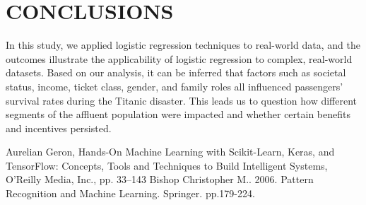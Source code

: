 \documentclass[conference]{IEEEtran}
\begin{document}
\vspace{2mm} %

\section{CONCLUSIONS}
In this study, we applied logistic regression techniques to real-world data, and the outcomes illustrate the applicability of logistic regression to complex, real-world datasets. Based on our analysis, it can be inferred that factors such as societal status, income, ticket class, gender, and family roles all influenced passengers’ survival rates during the Titanic disaster. This leads us to question how different segments of the affluent population were impacted and whether certain benefits and incentives persisted.

\begin{thebibliography}{10}
Aurelian Geron, Hands-On Machine Learning with Scikit-Learn, Keras, and TensorFlow: Concepts, Tools and Techniques to Build Intelligent Systems, O’Reilly Media, Inc., pp. 33–143
Bishop Christopher M.. 2006. Pattern Recognition and Machine Learning. Springer. pp.179-224.
\end{thebibliography}
\vspace{12pt}
\end{document}
